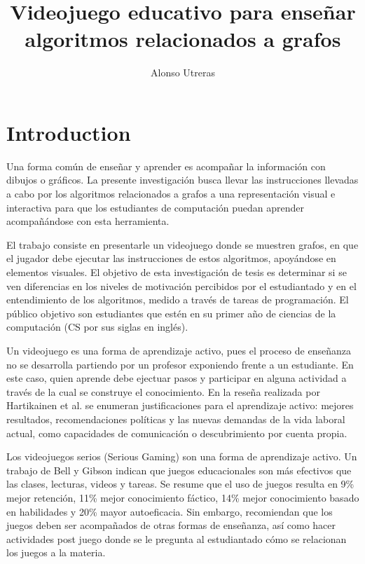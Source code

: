 \documentclass[submission]{eptcs}
\title{Videojuego educativo para enseñar algoritmos relacionados a grafos}
\author{ Alonso Utreras
\institute{Department of Computer Science\\
University of Chile\\
Santiago, Chile}
\email{alonso.utreras@ug.uchile.cl}
\email{autreras@dcc.uchile.cl}
}
\begin{document}
\maketitle

\section{Introduction}
 
Una forma común de enseñar y aprender es acompañar la información con dibujos o gráficos. La presente investigación
busca llevar las instrucciones llevadas a cabo por los algoritmos relacionados a grafos a una
representación visual e interactiva para que los estudiantes de computación puedan aprender acompañándose
con esta herramienta. 

El trabajo consiste en presentarle un videojuego donde se muestren grafos, en que el jugador
debe ejecutar las instrucciones de estos algoritmos, apoyándose en elementos visuales. El objetivo de esta investigación de tesis es 
determinar si se ven diferencias en los niveles de motivación percibidos por el estudiantado y en el entendimiento
de los algoritmos, medido a través de tareas de programación. El público objetivo son estudiantes
que estén en su primer año de ciencias de la computación (CS por sus siglas en inglés).

Un videojuego es una forma de aprendizaje activo, \cite{active_learning_review} pues el proceso de enseñanza no se desarrolla partiendo por un profesor
exponiendo frente a un estudiante. En este caso, quien aprende debe ejectuar pasos y
participar en alguna actividad a través de la cual se construye el conocimiento. En la reseña realizada por Hartikainen et al. \cite{active_learning_review}
se enumeran justificaciones para el aprendizaje activo:  mejores resultados, recomendaciones políticas y las nuevas demandas de la vida laboral actual,
como capacidades de comunicación o descubrimiento por cuenta propia. 

Los videojuegos serios (Serious Gaming) son una forma de aprendizaje activo. Un trabajo de Bell y Gibson \cite{evaluation_of_games_for_teaching_cs} indican que juegos
educacionales son más efectivos que las clases, lecturas, videos y tareas. Se resume que el uso de juegos resulta en 9\% mejor retención, 11\% mejor conocimiento fáctico,
14\% mejor conocimiento basado en habilidades y 20\% mayor autoeficacia. Sin embargo, recomiendan que los juegos deben ser acompañados
de otras formas de enseñanza, así como hacer actividades post juego donde se le pregunta al estudiantado cómo se relacionan los juegos a la materia.
\end{document}
